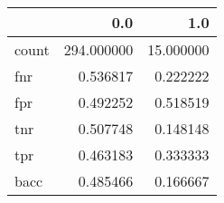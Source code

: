 \begin{tabular}{lrr}
\toprule
{} &         0.0 &        1.0 \\
\midrule
count &  294.000000 &  15.000000 \\
fnr   &    0.536817 &   0.222222 \\
fpr   &    0.492252 &   0.518519 \\
tnr   &    0.507748 &   0.148148 \\
tpr   &    0.463183 &   0.333333 \\
bacc  &    0.485466 &   0.166667 \\
\bottomrule
\end{tabular}
